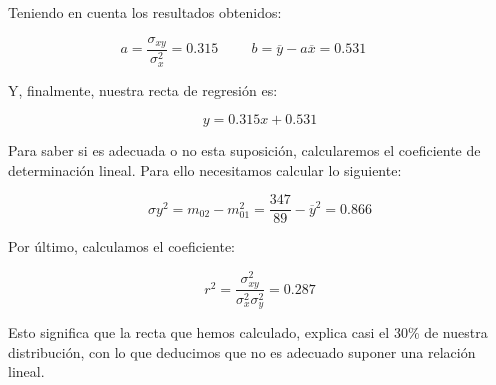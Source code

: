 Teniendo en cuenta los resultados obtenidos:

\begin{equation*}
    a = \dfrac{\sigma_{xy}}{\sigma_x^2} = 0.315
    \hspace{1cm}
    b = \overline{y} - a \overline{x} = 0.531
    \hspace{1cm}
\end{equation*}

Y, finalmente, nuestra recta de regresión es:

\begin{equation*}
    y = 0.315x + 0.531
\end{equation*}

\subproblem
Para saber si es adecuada o no esta suposición, calcularemos el coeficiente de determinación lineal. Para ello necesitamos calcular lo siguiente:

\begin{equation*}
    \sigma{y}^2 = m_{02} - m_{01}^2 = \dfrac{347}{89} - \overline{y}^2 = 0.866
\end{equation*}

Por último, calculamos el coeficiente:

\begin{equation*}
    r^2 = \dfrac{\sigma_{xy}^2}{\sigma_x^2 \sigma_y^2} = 0.287
\end{equation*}

Esto significa que la recta que hemos calculado, explica casi el 30\% de nuestra distribución, con lo que deducimos que no es adecuado suponer una relación lineal.
